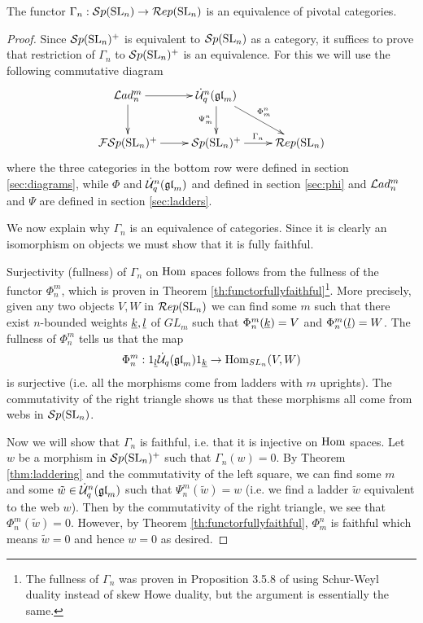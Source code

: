 \documentclass[11pt,leqno]{article}
\begin{document}
\begin{thm}\label{thm:main}
The functor $\Gamma_n: {\mathcal{S}p}({\rm{SL}}_n) \rightarrow \mathcal{R}ep({\rm{SL}}_n)$ is an equivalence of pivotal categories.
\end{thm}
\begin{proof}
Since ${\mathcal{S}p}({\rm{SL}}_n)^+ $ is equivalent to $ {\mathcal{S}p}({\rm{SL}}_n) $ as a category, it suffices to prove that restriction of $ \Gamma_n $ to $ {\mathcal{S}p}({\rm{SL}}_n)^+ $ is an equivalence. For this we will use the following commutative diagram
\begin{equation}\label{diag:main}
\xymatrix{
\Lad_n^m \ar[r] \ar[d] & \dU^n(\gl_m) \ar[dr]^{\Phi_m^n} \ar[d]_{\Psi_m^n} & \\
\FSp(\SL_n)^+ \ar[r] & \Sp(\SL_n)^+ \ar[r]^{\Gamma_n} & \Rep(\SL_n) \\
}
\end{equation}
where the three categories in the bottom row were defined in section \ref{sec:diagrams}, while
$\Phi$ and $\dot{{\mathcal{U}}}_q^n({\mathfrak{gl}}_m)$ and defined in section \ref{sec:phi} and $\mathcal{L}ad_n^m$ and $\Psi$ are defined in section \ref{sec:ladders}.

We now explain why $\Gamma_n$ is an equivalence of categories. Since it is clearly an isomorphism on objects we must show that it is fully faithful.

Surjectivity (fullness) of $\Gamma_n$ on $\operatorname{Hom}$ spaces follows from the fullness of the functor $ \Phi_n^m $, which is proven in Theorem \ref{th:functorfullyfaithful}\footnote{The fullness of $\Gamma_n$ was proven in Proposition 3.5.8 of \cite{0704.1503} using Schur-Weyl duality instead of skew Howe duality, but the argument is essentially the same.}.  More precisely, given any two objects $ V, W $ in $\mathcal{R}ep({\rm{SL}}_n) $ we can find some $m$ such that there exist $ n$-bounded weights $ {\underline{k}}, {\underline{l}} $ of $ GL_m$ such that $\Phi_n^m({\underline{k}}) = V$ and $\Phi_n^m({\underline{l}}) = W $. The fullness of $ \Phi_n^m $ tells us that the map
$$
\Phi_n^m : 1_{{\underline{l}}} \dot{{\mathcal{U}}}_q({\mathfrak{gl}}_m) 1_{{\underline{k}}} \rightarrow \operatorname{Hom}_{SL_n}(V, W)
$$
is surjective (i.e. all the morphisms come from ladders with $ m $ uprights).  The commutativity of the right triangle shows us that these morphisms all come from webs in $ {\mathcal{S}p}({\rm{SL}}_n) $.

Now we will show that $ \Gamma_n $ is faithful, i.e. that it is injective on $ \operatorname{Hom}$ spaces.  Let $w$ be a morphism in $ {\mathcal{S}p}({\rm{SL}}_n)^+ $ such that $\Gamma_n(w)=0$.  By Theorem \ref{thm:laddering} and the commutativity of the left square, we can find some $ m $ and some $\tilde{w} \in \dot{{\mathcal{U}}}_q^n({\mathfrak{gl}}_m) $ such that $ \Psi_n^m(\tilde{w}) = w $ (i.e. we find a ladder $ \tilde{w} $ equivalent to the web $ w $).  Then by the commutativity of the right triangle, we see that $ \Phi_n^m(\tilde{w}) = 0 $.  However, by Theorem \ref{th:functorfullyfaithful}, $\Phi_m^n$ is faithful which means $\tilde{w}=0$ and hence $w=0$ as desired.
\end{proof}
\end{document}
